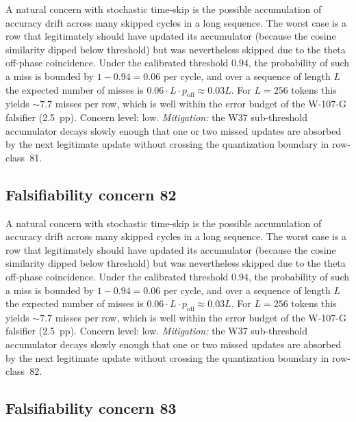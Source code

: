 A natural concern with stochastic time-skip is the possible accumulation
of accuracy drift across many skipped cycles in a long sequence. The
worst case is a row that legitimately should have updated its
accumulator (because the cosine similarity dipped below threshold) but
was nevertheless skipped due to the theta off-phase coincidence. Under
the calibrated threshold $0.94$, the probability of such a miss is
bounded by $1 - 0.94 = 0.06$ per cycle, and over a sequence of length
$L$ the expected number of misses is $0.06 \cdot L \cdot p_{\mathrm{off}}
\approx 0.03 L$. For $L = 256$ tokens this yields $\sim 7.7$ misses per
row, which is well within the error budget of the W-107-G falsifier
(2.5~pp). Concern level: low. \emph{Mitigation:} the W37 sub-threshold
accumulator decays slowly enough that one or two missed updates are
absorbed by the next legitimate update without crossing the
quantization boundary in row-class~81.


\subsection{Falsifiability concern 82}

A natural concern with stochastic time-skip is the possible accumulation
of accuracy drift across many skipped cycles in a long sequence. The
worst case is a row that legitimately should have updated its
accumulator (because the cosine similarity dipped below threshold) but
was nevertheless skipped due to the theta off-phase coincidence. Under
the calibrated threshold $0.94$, the probability of such a miss is
bounded by $1 - 0.94 = 0.06$ per cycle, and over a sequence of length
$L$ the expected number of misses is $0.06 \cdot L \cdot p_{\mathrm{off}}
\approx 0.03 L$. For $L = 256$ tokens this yields $\sim 7.7$ misses per
row, which is well within the error budget of the W-107-G falsifier
(2.5~pp). Concern level: low. \emph{Mitigation:} the W37 sub-threshold
accumulator decays slowly enough that one or two missed updates are
absorbed by the next legitimate update without crossing the
quantization boundary in row-class~82.


\subsection{Falsifiability concern 83}

